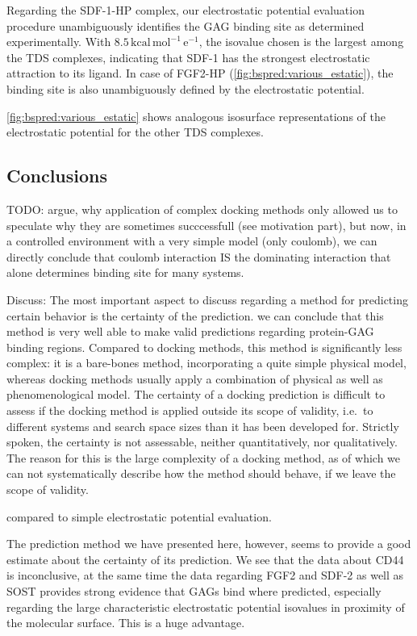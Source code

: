 Regarding the SDF-1-HP complex, our electrostatic potential evaluation procedure
unambiguously identifies the GAG binding site as determined experimentally. With
$8.5\,\mathrm{kcal\,mol^{-1}\,e^{-1}}$, the isovalue chosen is the largest among
the TDS complexes, indicating that SDF-1 has the strongest electrostatic
attraction to its ligand. In case of FGF2-HP (\cref{fig:bspred:various_estatic}), the
binding site is also unambiguously defined by the electrostatic potential.



\cref{fig:bspred:various_estatic} shows analogous isosurface representations of
the electrostatic potential for the other TDS complexes.



\subsection{Conclusions}


TODO: argue, why application of complex docking methods only allowed us to
speculate why they are sometimes succcessfull (see motivation part), but now,
in a controlled environment with a very simple model (only coulomb), we can
directly conclude that coulomb interaction IS the dominating interaction that
alone determines binding site for many systems.


Discuss: The most important aspect to discuss regarding a method for predicting
certain behavior is the certainty of the prediction. we can conclude that this
method is very well able to make valid predictions regarding protein-GAG binding
regions. Compared to docking methods, this method is significantly less complex:
it is a bare-bones method, incorporating a quite simple physical model, whereas
docking methods usually apply a combination of physical as well as
phenomenological model. The certainty of a docking prediction is difficult to
assess if the docking method is applied outside its scope of validity, i.e.\ to
different systems and search space sizes than it has been developed for.
Strictly spoken, the certainty is not assessable, neither quantitatively, nor
qualitatively. The reason for this is the large complexity of a docking method,
as of which we can not systematically describe how the method should behave, if
we leave the scope of validity.

compared to simple electrostatic potential evaluation.

The prediction method we have presented here, however, seems to provide a good
estimate about the certainty of its prediction. We see that the data about CD44
is inconclusive, at the same time the data regarding FGF2 and SDF-2 as well as
SOST provides strong evidence that GAGs bind where predicted, especially regarding
the large characteristic electrostatic potential isovalues in proximity of the
molecular surface. This is a huge advantage.


